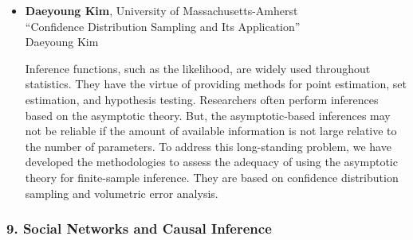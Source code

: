 \begin{itemize}
\item \textbf{Daeyoung Kim}, University of Massachusetts-Amherst \\
``Confidence Distribution Sampling and Its Application'' \\
Daeyoung Kim


Inference functions, such as the likelihood, are widely used throughout statistics. They have the virtue of providing methods for point estimation, set estimation, and hypothesis testing.
Researchers often perform  inferences based on the asymptotic theory.  
But, the asymptotic-based inferences may not be reliable if the amount of available information is not large relative to the number of parameters. 
To address this long-standing problem, we have developed the methodologies to assess the adequacy of using the asymptotic
theory for finite-sample inference.  They are based on confidence distribution sampling and volumetric error analysis.

\end{itemize}

\subsubsection*{9. Social Networks and Causal Inference}

